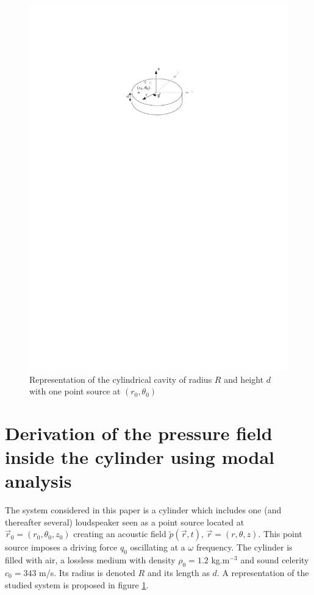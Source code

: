 \documentclass[%
 reprint,
 amsmath,amssymb,
 aps,
]{revtex4-2}
\begin{document}
\begin{figure}
    \centering
    \includegraphics[width=.35\textwidth]{figures/schema.pdf}
    \caption{Representation of the cylindrical cavity of radius $R$ and height $d$ with one point source at $(r_0, \theta_0)$}
    \label{fig:schema}
\end{figure}

\section{Derivation of the pressure field inside the cylinder using modal analysis}
The system considered in this paper is a cylinder which includes one (and thereafter several) loudspeaker seen as a point source located at $\vec{r}_0 = (r_0, \theta_0, z_0)$ creating an acoustic field $\tilde{p}(\vec{r}, t)$, $\vec{r} = (r, \theta, z)$. This point source imposes a driving force $q_0$ oscillating at a $\omega$ frequency. The cylinder is filled with air, a lossless medium with density $\rho_0 = 1.2$ kg.m$^{-3}$ and sound celerity $c_0 = 343$ m/s. Its radius is denoted $R$ and its length as $d$. A representation of the studied system is proposed in figure \ref{fig:schema}.
\end{document}
